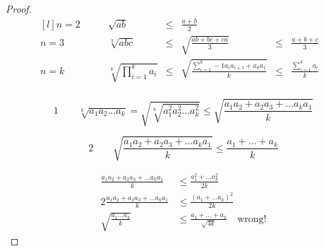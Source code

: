 \documentclass[10pt,a4paper]{book}
\begin{document}
	\begin{proof}
		\begin{equation}
			\begin{aligned}[l]
				n=2\qquad & \sqrt{ab}      &\le& \frac{a+b}{2} & & \\
				n=3\qquad & \sqrt[3]{abc}  &\le& \sqrt{\frac{ab+bc+ca}{3}}   &\le& \frac{a+b+c}{3}\\
				n=k\qquad & \sqrt[k]{\prod_{i=1}^k a_i}       &\le& \sqrt{\frac{\sum_{i=1}^k-1a_ia_{i+1} + a_ka_1}{k}} &\le& \frac{\sum_{i=1}^ka_i}{k} &\\
			\end{aligned}
		\end{equation}
		
		\begin{equation}
			\text{1} \qquad
			\sqrt[k]{a_1a_2\dots a_k} = \sqrt{\sqrt[k]{a_1^2a_2^2\dots a_k^2}}\le\sqrt{\frac{a_1a_2+a_2a_3+\dots a_ka_1}{k}}
		\end{equation}
		
		\begin{equation}
			\text{2} \qquad
			\sqrt{\frac{a_1a_2+a_2a_3+\dots a_ka_1}{k}} \le \frac{a_1+\dots + a_k}{k}
		\end{equation}
		
		\begin{equation}
			\begin{aligned}
				\frac{a_1a_2+a_2a_3+\dots a_ka_1}{k} &\le \frac{a_1^2 + \dots a_k^2}{2k}\\
				2\frac{a_1a_2+a_2a_3+\dots a_ka_1}{k} &\le \frac{(a_1 + \dots a_k)^2}{2k}\\
				\sqrt{\frac{a_1\dots a_k}{k}} &\le \frac{a_1+\dots +a_k}{\sqrt{4k}}\quad\text{wrong!}
			\end{aligned}
		\end{equation}
		
		
		
	\end{proof}
	
\end{document}
